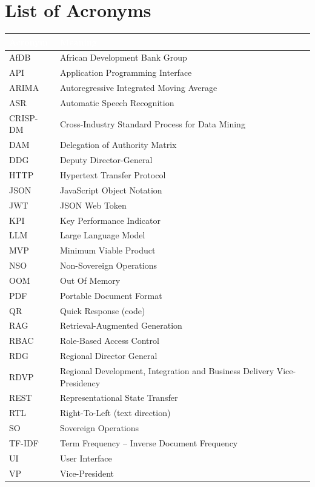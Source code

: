 \listoffigures
{}
\newpage

\listoftables
{}
\newpage

\chapter*{List of Acronyms}

\begin{longtable}{|p{}|p{}|}
\hline
\rowcolor{thesisgreen}\textcolor{white}{\textbf{Acronym}} & \textcolor{white}{\textbf{Meaning}} \\
\hline\endhead
AfDB & African Development Bank Group \\ \hline
API & Application Programming Interface \\ \hline
ARIMA & Autoregressive Integrated Moving Average \\ \hline
ASR & Automatic Speech Recognition \\ \hline
CRISP-DM & Cross-Industry Standard Process for Data Mining \\ \hline
DAM & Delegation of Authority Matrix \\ \hline
DDG & Deputy Director-General \\ \hline
HTTP & Hypertext Transfer Protocol \\ \hline
JSON & JavaScript Object Notation \\ \hline
JWT & JSON Web Token \\ \hline
KPI & Key Performance Indicator \\ \hline
LLM & Large Language Model \\ \hline
MVP & Minimum Viable Product \\ \hline
NSO & Non-Sovereign Operations \\ \hline
OOM & Out Of Memory \\ \hline
PDF & Portable Document Format \\ \hline
QR & Quick Response (code) \\ \hline
RAG & Retrieval-Augmented Generation \\ \hline
RBAC & Role-Based Access Control \\ \hline
RDG & Regional Director General \\ \hline
RDVP & Regional Development, Integration and Business Delivery Vice-Presidency \\ \hline
REST & Representational State Transfer \\ \hline
RTL & Right-To-Left (text direction) \\ \hline
SO & Sovereign Operations \\ \hline
TF-IDF & Term Frequency -- Inverse Document Frequency \\ \hline
UI & User Interface \\ \hline
VP & Vice-President \\ \hline
\end{longtable}

\newpage
\thispagestyle{empty}
\mbox{}
